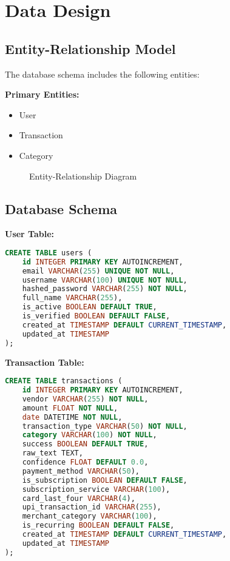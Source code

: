\documentclass[11pt,a4paper]{report}
\begin{document}
\section{Data Design}

\subsection{Entity-Relationship Model}

The database schema includes the following entities:

\textbf{Primary Entities:}
\begin{itemize}
    \item User
    \item Transaction
    \item Category
\end{itemize}

\begin{figure}[htbp]
    \centering
    \caption{Entity-Relationship Diagram}
    \label{fig:er_diagram}
\end{figure}

\subsection{Database Schema}

\textbf{User Table:}
\begin{lstlisting}[language=SQL]
CREATE TABLE users (
    id INTEGER PRIMARY KEY AUTOINCREMENT,
    email VARCHAR(255) UNIQUE NOT NULL,
    username VARCHAR(100) UNIQUE NOT NULL,
    hashed_password VARCHAR(255) NOT NULL,
    full_name VARCHAR(255),
    is_active BOOLEAN DEFAULT TRUE,
    is_verified BOOLEAN DEFAULT FALSE,
    created_at TIMESTAMP DEFAULT CURRENT_TIMESTAMP,
    updated_at TIMESTAMP
);
\end{lstlisting}

\textbf{Transaction Table:}
\begin{lstlisting}[language=SQL]
CREATE TABLE transactions (
    id INTEGER PRIMARY KEY AUTOINCREMENT,
    vendor VARCHAR(255) NOT NULL,
    amount FLOAT NOT NULL,
    date DATETIME NOT NULL,
    transaction_type VARCHAR(50) NOT NULL,
    category VARCHAR(100) NOT NULL,
    success BOOLEAN DEFAULT TRUE,
    raw_text TEXT,
    confidence FLOAT DEFAULT 0.0,
    payment_method VARCHAR(50),
    is_subscription BOOLEAN DEFAULT FALSE,
    subscription_service VARCHAR(100),
    card_last_four VARCHAR(4),
    upi_transaction_id VARCHAR(255),
    merchant_category VARCHAR(100),
    is_recurring BOOLEAN DEFAULT FALSE,
    created_at TIMESTAMP DEFAULT CURRENT_TIMESTAMP,
    updated_at TIMESTAMP
);
\end{lstlisting}
\end{document}
